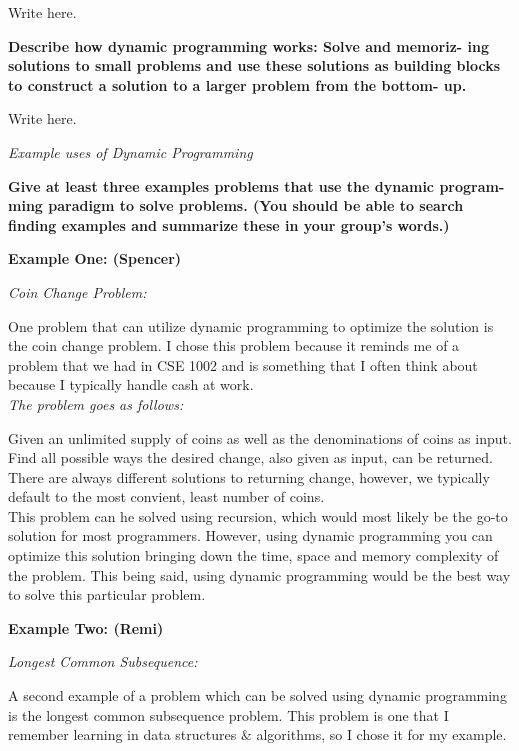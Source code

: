 \documentclass{article}
\begin{document}
\bigskip

\medskip

Write here.

\bigskip

\noindent \textbf{Describe how dynamic programming works: Solve and memoriz-
ing solutions to small problems and use these solutions as building
blocks to construct a solution to a larger problem from the bottom-
up.}

\medskip

Write here.

\bigskip

\noindent \textit{Example uses of Dynamic Programming}


\textbf{Give at least three examples problems that use the dynamic program-
ming paradigm to solve problems. (You should be able to search
finding examples and summarize these in your group’s words.)}

\bigskip

\noindent \textbf{Example One: (Spencer)}

\noindent \textit{Coin Change Problem:}

One problem that can utilize dynamic programming to optimize the
solution is the coin change problem. I chose this problem because 
it reminds me of a problem that we had in CSE 1002 and is something
that I often think about because I typically handle cash at work.\\

\noindent \textit{The problem goes as follows:}

Given an unlimited supply of coins as well as the denominations of
coins as input. Find all possible ways the desired change, also given 
as input, can be returned. There are always different solutions to
returning change, however, we typically default to the most convient,
least number of coins.\\

This problem can he solved using recursion, which would most likely be
the go-to solution for most programmers. However, using dynamic programming
you can optimize this solution bringing down the time, space and memory
complexity of the problem. This being said, using dynamic programming would
be the best way to solve this particular problem.

\bigskip

\noindent \textbf{Example Two: (Remi)}

\noindent \textit{Longest Common Subsequence:}

A second example of a problem which can be solved using dynamic programming 
is the longest common subsequence problem. This problem is one that I 
remember learning in data structures $\&$ algorithms, so I chose it for my 
example.\\
\end{document}

